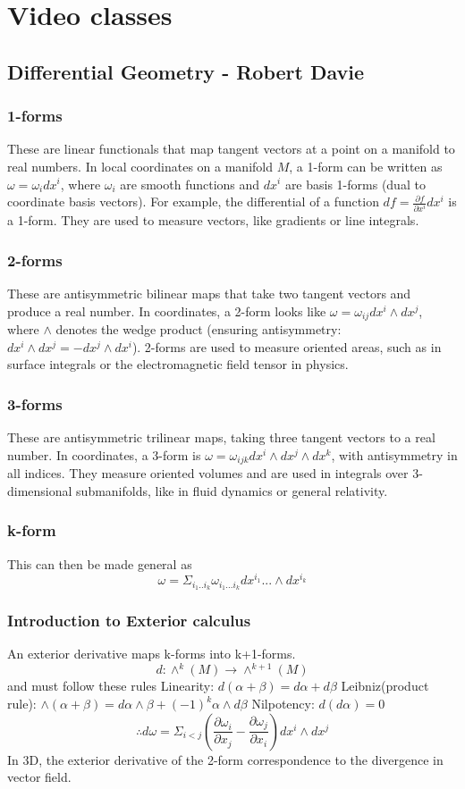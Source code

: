\chapter{Video classes}
\section{Differential Geometry - Robert Davie}
\subsection{1-forms}
These are linear functionals that map tangent vectors at a point on a manifold to real numbers. In local coordinates on a manifold $M$, a 1-form can be written as $\omega = \omega_i dx^i$, where $\omega_i$ are smooth functions and $dx^i$ are basis 1-forms (dual to coordinate basis vectors). For example, the differential of a function $df = \frac{\partial f}{\partial x^i} dx^i$ is a 1-form. They are used to measure vectors, like gradients or line integrals.
\subsection{2-forms}
These are antisymmetric bilinear maps that take two tangent vectors and produce a real number. In coordinates, a 2-form looks like $\omega = \omega_{ij} dx^i \wedge dx^j$, where $\wedge$ denotes the wedge product (ensuring antisymmetry: $dx^i \wedge dx^j = -dx^j \wedge dx^i$). 2-forms are used to measure oriented areas, such as in surface integrals or the electromagnetic field tensor in physics.
\subsection{3-forms}
These are antisymmetric trilinear maps, taking three tangent vectors to a real number. In coordinates, a 3-form is $\omega = \omega_{ijk} dx^i \wedge dx^j \wedge dx^k$, with antisymmetry in all indices. They measure oriented volumes and are used in integrals over 3-dimensional submanifolds, like in fluid dynamics or general relativity.
\subsection{k-form}
This can then be made general as
$$\omega=\Sigma_{i_1..i_k}\omega_{i_1...i_k} dx^{i_1}... \wedge dx^{i_k}$$

\subsection{Introduction to Exterior calculus}
An exterior derivative maps k-forms into k+1-forms.
$$d: \wedge^k(M) \to \wedge^{k+1}(M)$$
and must follow these rules
Linearity: $d(\alpha + \beta) =d\alpha + d\beta$
Leibniz(product rule): $\wedge(\alpha + \beta)= d\alpha \wedge \beta + (-1)^k \alpha \wedge d\beta $
Nilpotency: $d(d\alpha)=0$
$$\therefore d \omega=\Sigma_{i<j} (\frac{\partial \omega_i}{\partial x_j} - \frac{\partial \omega_j}{\partial x_i})dx^i \wedge dx^j$$
In 3D, the exterior derivative of the 2-form correspondence to the divergence in vector field.

